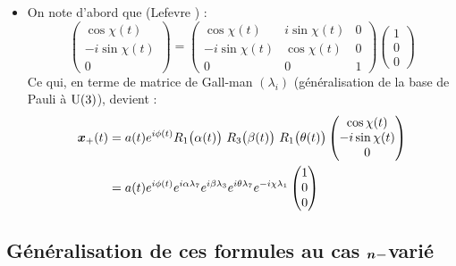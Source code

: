 \begin{itemize}
	\item On note d'abord que (Lefevre \cite{lefevre_polarization_2021}) :
	\[\begin{pmatrix}
		\cos\chi(t) \\ -i\sin\chi(t) \\ 0
	\end{pmatrix} = \begin{pmatrix}
		\cos\chi(t) & i\sin\chi(t) & 0 \\ -i\sin\chi(t) & \cos\chi(t) & 0 \\ 0 & 0 & 1
	\end{pmatrix}\begin{pmatrix}
		1 \\ 0 \\ 0
	\end{pmatrix}\]
	Ce qui, en terme de matrice de Gall-man $(\lambda_i)$ (généralisation de la base de Pauli à $\U{3}$), devient :
	\begin{align*}
		\sa{\bf{x}}(t) &= a(t)e^{i\phi(t)} R_1\big(\alpha(t)\big)\ R_3\big(\beta(t)\big)\ R_1\big(\theta(t)\big)\begin{pmatrix}
			\cos\chi(t) \\ -i\sin\chi(t) \\ 0
		\end{pmatrix} \\
		&= a(t)e^{i\phi(t)} e^{i\alpha \lambda_7} e^{i\beta \lambda_3} e^{i\theta \lambda_7} e^{-i\chi \lambda_1}\begin{pmatrix}
			1 \\ 0 \\ 0
		\end{pmatrix}
	\end{align*}
	
	
\end{itemize}





\subsection{Généralisation de ces formules au cas $\bf{n-}$varié}\label{subsec:phase_instant}

